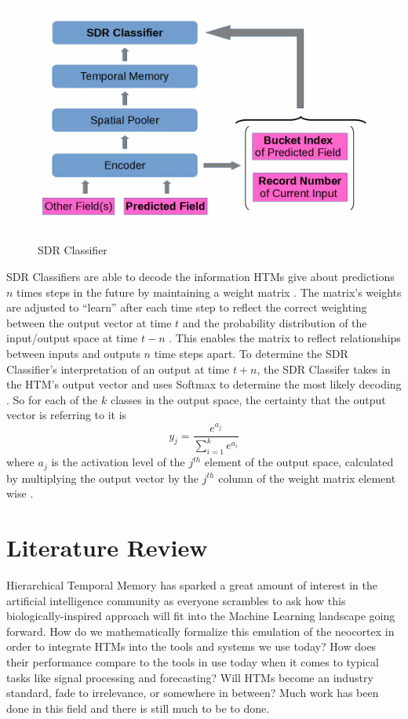 \documentclass[oneside,12pt,openany]{book}
\begin{document}
	\begin{figure}[h!]
		\centering
		\includegraphics[width=\linewidth]{images/SDRClassifier.jpg}
		\caption{SDR Classifier}
		\label{fig 3}
	\end{figure}
	
	SDR Classifiers are able to decode the information HTMs give about predictions $n$ times steps in the future by maintaining a weight matrix \cite{Dillon}. The matrix's weights are adjusted to ``learn'' after each time step to reflect the correct weighting between the output vector at time $t$ and the probability distribution of the input/output space at time $t-n$ \cite{Dillon}. This enables the matrix to reflect relationships between inputs and outputs $n$ time steps apart. To determine the SDR Classifier's interpretation of an output at time $t+n$, the SDR Classifer takes in the HTM's output vector and uses Softmax to determine the most likely decoding \cite{Dillon}. So for each of the $k$ classes in the output space, the certainty that the output vector is referring to it is $$y_{j} = \dfrac{e^{a_{j}}}{\sum_{i=1}^{k} e^{a_{i}}}$$ where $a_{j}$ is the activation level of the $j^{th}$ element of the output space, calculated by multiplying the output vector by the $j^{th}$ column of the weight matrix element wise \cite{Dillon}. 
	
	
	
	\chapter{Literature Review}
	
	Hierarchical Temporal Memory has sparked a great amount of interest in the artificial intelligence community as everyone scrambles to ask how this biologically-inspired approach will fit into the Machine Learning landscape going forward. How do we mathematically formalize this emulation of the neocortex in order to integrate HTMs into the tools and systems we use today? How does their performance compare to the tools in use today when it comes to typical tasks like signal processing and forecasting? Will HTMs become an industry standard, fade to irrelevance, or somewhere in between? Much work has been done in this field and there is still much to be to done.
	
\end{document}
